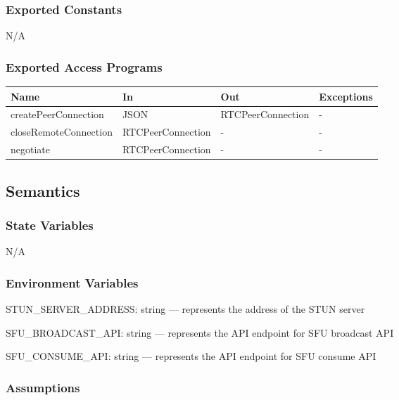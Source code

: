 \documentclass[12pt, titlepage]{article}
\begin{document}
\subsubsection{Exported Constants}

N/A

\subsubsection{Exported Access Programs}

\begin{center}
  \begin{tabular}{p{4cm} p{4cm} p{4cm} p{2cm}}
    \hline
    \textbf{Name}               & \textbf{In}             & \textbf{Out}            & \textbf{Exceptions} \\
    \hline
    createPeerConnection  & JSON              & RTCPeerConnection & -             \\
    closeRemoteConnection & RTCPeerConnection & -                 & -             \\
    negotiate             & RTCPeerConnection & -                 & -             \\
    \hline
  \end{tabular}
\end{center}

\subsection{Semantics}

\subsubsection{State Variables}

N/A

\subsubsection{Environment Variables}

\noindent STUN\_SERVER\_ADDRESS: string --- represents the address of the STUN server

\noindent SFU\_BROADCAST\_API: string --- represents the API endpoint for SFU broadcast API

\noindent SFU\_CONSUME\_API: string --- represents the API endpoint for SFU consume API

\subsubsection{Assumptions}
\end{document}
